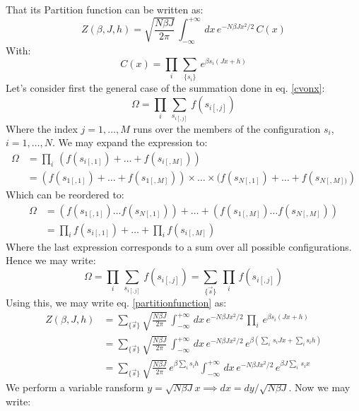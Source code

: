 \documentclass[a4paper]{article}
\begin{document}
That its Partition function can be written as:
\begin{equation}\label{partitionfunction}
  Z(\beta,J,h)=\sqrt{\frac{N\beta J}{2 \pi}}\,\int_{-\infty}^{+\infty}\,dx\,e^{-N\beta Jx^2/2}\,C(x)
\end{equation} 
With:
\begin{equation}
    C(x)=\prod\limits_i\,\sum_{\{s_i\}}\,e^{\beta s_i(Jx+h)} \label{cvonx}
\end{equation}
Let's consider first the general case of the summation done in eq. \ref{cvonx}:
\begin{equation}
    \Omega=\prod\limits_i\,\sum_{s_{i[,j]}}\,f(s_{i[,j]})
\end{equation}
Where the index $j=1,\dots,M$ runs over the members of the configuration $s_i$, $i=1,\dots,N$. We may expand the expression to:
\begin{align}
    \Omega&=\prod\limits_i\,(f(s_{i[,1]})+\dots+f(s_{i[,M]})) \\
    &=(f(s_{1[,1]})+\dots+f(s_{1[,M]}))\times\dots\times(f(s_{N[,1]})+\dots+f(s_{N[,M])})
\end{align}
Which can be reordered to:
\begin{align}
    \Omega&=(f(s_{1[,1]}) \dots f(s_{N[,1]}))+\dots +(f(s_{1[,M]}) \dots f(s_{N[,M]})) \\
    &=\prod\limits_i f(s_{i[,1]})+\dots +\prod\limits_i f(s_{i[,M]})
\end{align}
Where the last expression corresponds to a sum over all possible configurations. Hence we may write:
\begin{equation}
    \Omega=\prod\limits_i\,\sum_{s_{i[,j]}}\,f(s_{i[,j]})=\sum_{\{\vec{s}\}}\,\prod\limits_i\,f(s_{i[,j]})
\end{equation}
Using this, we may write eq. \ref{partitionfunction} as:
\begin{align}
    Z(\beta,J,h)&=\sum_{\{\vec{s}\}}\sqrt{\frac{N\beta J}{2 \pi}}\,\int_{-\infty}^{+\infty}\,dx\,e^{-N\beta Jx^2/2}\,\prod\limits_i\,e^{\beta s_i(Jx+h)} \\
    &=\sum_{\{\vec{s}\}}\sqrt{\frac{N\beta J}{2 \pi}}\,\int_{-\infty}^{+\infty}\,dx\,e^{-N\beta Jx^2/2}\,e^{\beta (\sum_i\,s_iJx+\sum_i s_i h)}\\
    &=\sum_{\{\vec{s}\}}\sqrt{\frac{N\beta J}{2 \pi}}\,e^{\beta\sum_i s_i h}\int_{-\infty}^{+\infty}\,dx\,e^{-N\beta Jx^2/2}\,e^{\beta J\sum_i\,s_ix}
\end{align}
We perform a variable ransform $y=\sqrt{N\beta J}x\implies dx=dy/\sqrt{N\beta J}$. Now we may write:
\end{document}
